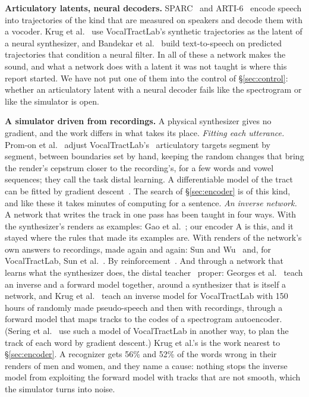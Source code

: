\documentclass[10pt,a4paper,twocolumn]{article}
\begin{document}
\textbf{Articulatory latents, neural decoders.} SPARC~\cite{sparc} and ARTI-6~\cite{arti6}
encode speech into trajectories of the kind that are measured on speakers and decode them with
a vocoder. Krug et al.~\cite{tt2} use VocalTractLab's synthetic trajectories as the latent of a
neural synthesizer, and Bandekar et al.~\cite{asftts} build text-to-speech on predicted
trajectories that condition a neural filter. In all of these a network makes the sound, and
what a network does with a latent it was not taught is where this report started. We have not
put one of them into the control of \S\ref{sec:control}: whether an articulatory latent with a
neural decoder fails like the spectrogram or like the simulator is open.

\textbf{A simulator driven from recordings.} A physical synthesizer gives no gradient, and the
work differs in what takes its place. \emph{Fitting each utterance.} Prom-on et
al.~\cite{promon} adjust VocalTractLab's~\cite{vtl} articulatory targets segment by segment,
between boundaries set by hand, keeping the random changes that bring the render's cepstrum
closer to the recording's, for a few words and vowel sequences; they call the task distal
learning. A differentiable model of the tract can be fitted by gradient
descent~\cite{sudholt,difftlm}. The search of \S\ref{sec:encoder} is of this kind, and like
these it takes minutes of computing for a sentence. \emph{An inverse network.} A network that
writes the track in one pass has been taught in four ways. With the synthesizer's renders as
examples: Gao et al.~\cite{gao}; our encoder A is this, and it stayed where the rules that made
its examples are. With renders of the network's own answers to recordings, made again and again:
Sun and Wu~\cite{emjem} and, for VocalTractLab, Sun et al.~\cite{sun}. By
reinforcement~\cite{shibata}. And through a network that learns what the synthesizer does, the
distal teacher~\cite{distal} proper: Georges et al.~\cite{georges,georges24} teach an inverse
and a forward model together, around a synthesizer that is itself a network, and Krug et
al.~\cite{krug} teach an inverse model for VocalTractLab with 150 hours of randomly made
pseudo-speech and then with recordings, through a forward model that maps tracks to the codes
of a spectrogram autoencoder. (Sering et al.~\cite{paule} use such a model of VocalTractLab
in another way, to plan the track of each word by gradient descent.) Krug et al.'s is the work
nearest to \S\ref{sec:encoder}. A recognizer gets 56\% and 52\% of the words wrong in their
renders of men and women, and they name a cause: nothing stops the inverse model from
exploiting the forward model with tracks that are not smooth, which the simulator turns into
noise.
\end{document}
